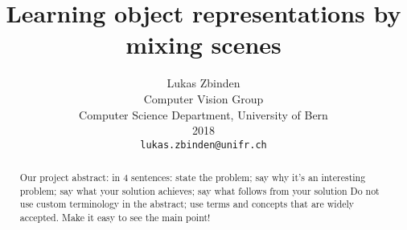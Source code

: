 \documentclass[12pt,a4paper]{article}
\begin{document}
\title{Learning object representations by mixing scenes}

\author{Lukas Zbinden\\
Computer Vision Group\\
Computer Science Department, University of Bern\\ 
2018\\
{\tt\small lukas.zbinden@unifr.ch}
}

\maketitle

\begin{abstract}
   Our project 
   abstract: in 4 sentences: state the problem; say why it's an interesting problem; say what your solution achieves; say what follows from your solution
   Do not use custom terminology in the abstract;
use terms and concepts that are widely accepted. Make it easy to see the main point!
\end{abstract}

\end{document}
